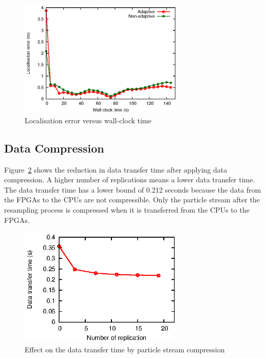 \begin{figure}[t!]
\centering
\includegraphics[width=0.7\textwidth]{runtime_reconfiguration/figures/fig_error}
\caption{Localisation error versus wall-clock time}
\label{fig:error}
\end{figure}

\subsection{Data Compression}
Figure~\ref{fig:compression} shows the reduction in data transfer time after applying data compression.
A higher number of replications means a lower data transfer time.
The data transfer time has a lower bound of 0.212 seconds because the data from the FPGAs to the CPUs are not compressible.
Only the particle stream after the resampling process is compressed when it is transferred from the CPUs to the FPGAs.

\begin{figure}[t!]
\centering
\includegraphics[width=0.7\textwidth]{runtime_reconfiguration/figures/fig_compression}
\caption{Effect on the data transfer time by particle stream compression}
\label{fig:compression}
\end{figure}

